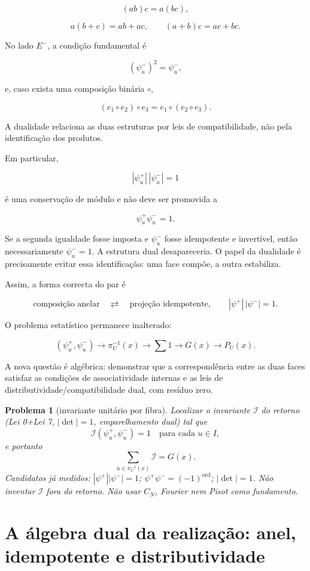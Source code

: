 \documentclass[11pt,a4paper]{article}
\newtheorem{problema}[teorema]{Problema}
\begin{document}
$$
(ab)c=a(bc),
$$

$$
a(b+c)=ab+ac,\qquad
(a+b)c=ac+bc.
$$

No lado \(E^-\), a condição fundamental é

$$
(\psi_u^-)^2=\psi_u^-,
$$

e, caso exista uma composição binária \(\circ\),

$$
(e_1\circ e_2)\circ e_3
=
e_1\circ(e_2\circ e_3).
$$

A dualidade relaciona as duas estruturas por leis de compatibilidade,
não pela identificação dos produtos.

Em particular,

$$
|\psi_u^+|\,|\psi_u^-|=1
$$

é uma conservação de módulo e não deve ser promovida a

$$
\psi_u^+\psi_u^-=1.
$$

Se a segunda igualdade fosse imposta e \(\psi_u^-\) fosse idempotente
e invertível, então necessariamente \(\psi_u^-=1\). A estrutura dual
desapareceria. O papel da dualidade é precisamente evitar essa
identificação: uma face compõe, a outra estabiliza.

Assim, a forma correcta do par é

$$
\boxed{
\text{composição anelar}
\quad\rightleftarrows\quad
\text{projeção idempotente},
\qquad
|\psi^+|\,|\psi^-|=1.
}
$$

O problema estatístico permanece inalterado:

$$
(\psi_u^+,\psi_u^-)
\longrightarrow
\pi_U^{-1}(x)
\longrightarrow
\sum 1
\longrightarrow
G(x)
\longrightarrow
P_U(x).
$$

A nova questão é algébrica: demonstrar que a correspondência entre as
duas faces satisfaz as condições de associatividade internas e as leis
de distributividade/compatibilidade dual, com resíduo zero.

\begin{problema}[invariante unitário por fibra]
\label{prob:norm}
Localizar o invariante $\mathcal I$ do retorno (Lei 0+Lei 7, $|\det|=1$, emparelhamento dual)
tal que
\[
\mathcal I(\psi_u^+,\psi_u^-)=1
\quad\text{para cada }u\in I,
\]
e portanto
\[
\sum_{u\in\pi_U^{-1}(x)}\mathcal I=G(x).
\]
Candidatos já medidos: $|\psi^+||\psi^-|=1$; $\psi^+\psi^-=(-1)^{\mathrm{ord}}$; $|\det|=1$.
Não inventar $\mathcal I$ fora do retorno. Não usar $C_N$, Fourier nem Pisot como fundamento.
\end{problema}

\section{A álgebra dual da realização: anel, idempotente e distributividade}
\label{sec:algebra-dual}
\end{document}
